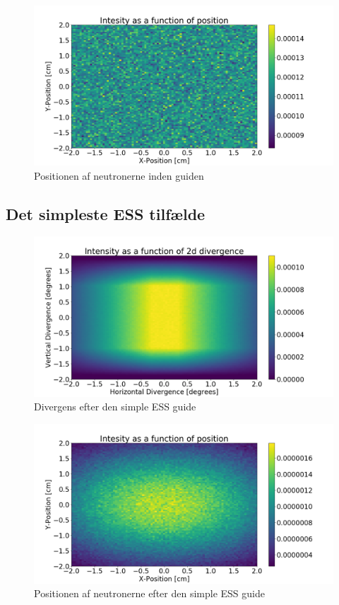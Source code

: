 \documentclass[12pt,oneside,a4paper]{article}
\begin{document}
{{{{{\begin{figure}[H]
\centering
\includegraphics[width=1\textwidth]{psd_straight_before.png}
\caption{Positionen af neutronerne inden guiden}
\end{figure}



\subsection{Det simpleste ESS tilfælde}

\begin{figure}[H]
\centering
\includegraphics[width=1\textwidth]{div_ess_simple_after.png}
\caption{Divergens efter den simple ESS guide}
\end{figure}


\begin{figure}[H]
\centering
\includegraphics[width=1\textwidth]{psd_ess_simple_after.png}
\caption{Positionen af neutronerne efter den simple ESS guide}
\end{figure}


}}}}}
\end{document}
